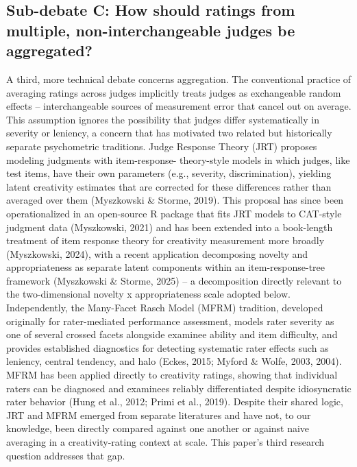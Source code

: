 \documentclass[
  12pt,
]{article}
\begin{document}
\subsection{Sub-debate C: How should ratings from multiple,
non-interchangeable judges be
aggregated?}\label{sub-debate-c-how-should-ratings-from-multiple-non-interchangeable-judges-be-aggregated}

A third, more technical debate concerns aggregation. The conventional
practice of averaging ratings across judges implicitly treats judges as
exchangeable random effects -- interchangeable sources of measurement
error that cancel out on average. This assumption ignores the
possibility that judges differ systematically in severity or leniency, a
concern that has motivated two related but historically separate
psychometric traditions. Judge Response Theory (JRT) proposes modeling
judgments with item-response- theory-style models in which judges, like
test items, have their own parameters (e.g., severity, discrimination),
yielding latent creativity estimates that are corrected for these
differences rather than averaged over them (Myszkowski \& Storme, 2019).
This proposal has since been operationalized in an open-source R package
that fits JRT models to CAT-style judgment data (Myszkowski, 2021) and
has been extended into a book-length treatment of item response theory
for creativity measurement more broadly (Myszkowski, 2024), with a
recent application decomposing novelty and appropriateness as separate
latent components within an item-response-tree framework (Myszkowski \&
Storme, 2025) -- a decomposition directly relevant to the
two-dimensional novelty x appropriateness scale adopted below.
Independently, the Many-Facet Rasch Model (MFRM) tradition, developed
originally for rater-mediated performance assessment, models rater
severity as one of several crossed facets alongside examinee ability and
item difficulty, and provides established diagnostics for detecting
systematic rater effects such as leniency, central tendency, and halo
(Eckes, 2015; Myford \& Wolfe, 2003, 2004). MFRM has been applied
directly to creativity ratings, showing that individual raters can be
diagnosed and examinees reliably differentiated despite idiosyncratic
rater behavior (Hung et al., 2012; Primi et al., 2019). Despite their
shared logic, JRT and MFRM emerged from separate literatures and have
not, to our knowledge, been directly compared against one another or
against naive averaging in a creativity-rating context at scale. This
paper's third research question addresses that gap.
\end{document}
